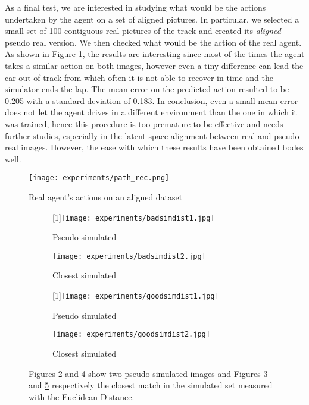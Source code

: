 As a final test, we are interested in studying what would be the actions undertaken by the agent on a set of aligned pictures. In particular, we selected a small set of 100 contiguous real pictures of the track and created its \textit{aligned} pseudo real version. We then checked what would be the action of the real agent. As shown in Figure \ref{fig:path_rec}, the results are interesting since most of the times the agent takes a similar action on both images, however even a tiny difference can lead the car out of track from which often it is not able to recover in time and the simulator ends the lap. The mean error on the predicted action resulted to be 0.205 with a standard deviation of 0.183. In conclusion, even a small mean error does not let the agent drives in a different environment than the one in which it was trained, hence this procedure is too premature to be effective and needs further studies, especially in the latent space alignment between real and pseudo real images. However, the ease with which these results have been obtained bodes well.

\begin{figure}[h]
  \begin{center}
    \texttt{[image: experiments/path\_rec.png]}
  \end{center}
  \caption{Real agent's actions on an aligned dataset}
  \label{fig:path_rec}
\end{figure}

\begin{figure}[h]
  \centering
  \begin{subfigure}{.24\linewidth}
      \centering
      \scalebox{-1}[1]{\texttt{[image: experiments/badsimdist1.jpg]}}
      \caption{Pseudo simulated}\label{fig:badsimdist1}
  \end{subfigure}%
  \hfill
  \begin{subfigure}{.24\linewidth}
    \centering
    \texttt{[image: experiments/badsimdist2.jpg]}
    \caption{Closest simulated}\label{fig:badsimdist2}
  \end{subfigure}%
  \hfill
  \begin{subfigure}{.24\linewidth}
      \centering
      \scalebox{-1}[1]{\texttt{[image: experiments/goodsimdist1.jpg]}}
      \caption{Pseudo simulated}\label{fig:goodsimdist1}
  \end{subfigure}%
  \hfill
  \begin{subfigure}{.24\linewidth}
    \centering
    \texttt{[image: experiments/goodsimdist2.jpg]}
    \caption{Closest simulated}\label{fig:goodsimdist2}
\end{subfigure}
  \caption{Figures \ref{fig:badsimdist1} and \ref{fig:goodsimdist1} show two pseudo simulated images and Figures \ref{fig:badsimdist2} and \ref{fig:goodsimdist2} respectively the closest match in the simulated set measured with the Euclidean Distance.}
  \label{fig:simdistance}
\end{figure}

